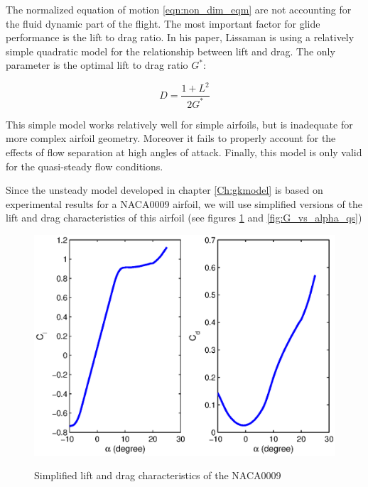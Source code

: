 The normalized equation of motion \ref{eqn:non_dim_eqm} are not accounting for the fluid dynamic part of the flight.
The most important factor for glide performance is the lift to drag ratio. 
In his paper, Lissaman \cite{Lissaman2007neutral} is using a relatively simple quadratic model for the relationship between lift and drag.
The only parameter is the optimal lift to drag ratio $G^*$:

\begin{equation}
D=\frac{1+L^2}{2G^*}
\label{eqn:Lissaman_G}
\end{equation}


\par This simple model works relatively well for simple airfoils, but is inadequate for more complex airfoil geometry.
Moreover it fails to properly account for the effects of flow separation at high angles of attack.
Finally, this model is only valid for the quasi-steady flow conditions.

\par Since the unsteady model developed in chapter \ref{Ch:gkmodel} is based on experimental results for a NACA0009 airfoil, we will use simplified versions of the lift and drag characteristics of this airfoil (see figures \ref{fig:Cl_Cd_vs_alpha_qs} and \ref{fig:G_vs_alpha_qs})

\begin{figure}[ht]
\begin{center}
  \scalebox{1.0}
  {\includegraphics{./Figures/NACA0009_steady_map_Cl_Cd.eps}} 
\end{center}
\caption{Simplified lift and drag characteristics of the NACA0009}
\label{fig:Cl_Cd_vs_alpha_qs}
\end{figure}


